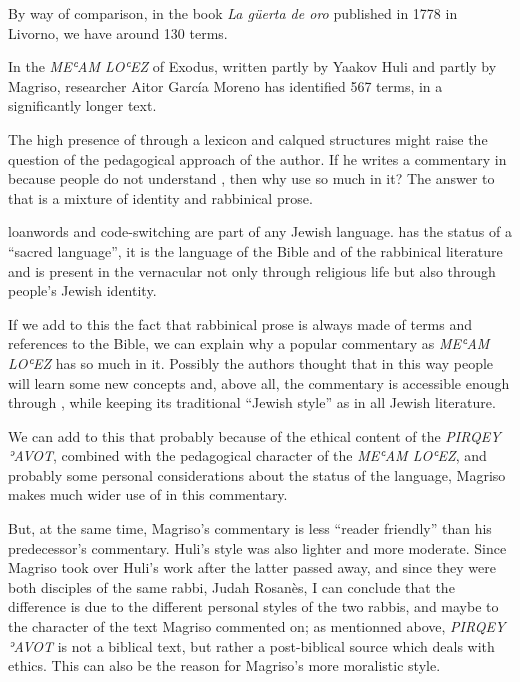 \documentclass[output=paper,colorlinks,citecolor=brown,babel,arabicfont]{langscibook}
\begin{document}
By way of comparison, in the book \textit{La güerta de oro} published in 1778 in Livorno, we have around 130  terms. 

In the \textit{MEʿAM LOʿEZ} of Exodus, written partly by Yaakov Huli and partly by Magriso,  researcher Aitor García Moreno has identified 567  terms, in a significantly longer text. 

The high presence of  through a lexicon and calqued structures might raise the question of the pedagogical approach of the author. If he writes a commentary in  because people do not understand , then why use so much  in it? The answer to that is a mixture of identity and rabbinical prose. 

 loanwords and code-switching are part of any Jewish language.  has the status of a ``sacred language'', it is the language of the Bible and of the rabbinical literature and is present in the vernacular  not only through religious life but also through people's Jewish identity. 

If we add to this the fact that rabbinical prose is always made of  terms and references to the Bible, we can explain why a popular commentary as \textit{MEʿAM LOʿEZ} has so much  in it. Possibly the authors thought that in this way people will learn some new  concepts and, above all, the commentary is accessible enough through , while keeping its traditional ``Jewish style'' as in all Jewish literature. 

We can add to this that probably because of the ethical content of the \textit{PIRQEY ʾAVOT}, combined with the pedagogical character of the \textit{MEʿAM LOʿEZ}, and probably some personal considerations about the status of the  language, Magriso makes much wider use of  in this commentary.

But, at the same time, Magriso's commentary is less ``reader friendly'' than his predecessor's commentary. Huli's style was also lighter and more moderate. Since Magriso took over Huli's work after the latter passed away, and since they were both disciples of the same rabbi, Judah Rosanès, I can conclude that the difference is due to the different personal styles of the two rabbis, and maybe to the character of the text Magriso commented on; as mentionned above, \textit{PIRQEY ʾAVOT} is not a biblical text, but rather a post-biblical source which deals with ethics. This can also be the reason for Magriso's more moralistic style. 
\end{document}
